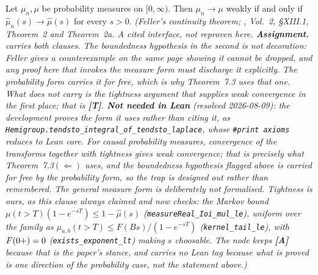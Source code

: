 \begin{proposition}\label{prop:laplace-continuity}
Let $\mu_n, \mu$ be probability measures on $[0,\infty)$. Then $\mu_n \to \mu$ weakly if and
only if $\hat\mu_n(s) \to \hat\mu(s)$ for every $s > 0$.
\statusA\quad{}\quad\emph{(Feller's continuity theorem;
, Vol.~2, \S XIII.1, Theorem~2 and Theorem~2a. A cited
interface, not reproven here. \textbf{Assignment.}  carries both clauses. The
boundedness hypothesis in the second is not decoration: Feller gives a counterexample on the
same page showing it cannot be dropped, and any proof here that invokes the measure form must
discharge it explicitly. The probability form carries it for free, which is why Theorem~7.3
uses that one. What  does not carry is the tightness argument that supplies weak
convergence in the first place; that is \textbf{[T]}. \textbf{Not needed in Lean} (resolved
2026-08-09): the development proves the form it uses rather than citing it, as
\texttt{Hemigroup.tendsto\_integral\_of\_tendsto\_laplace}, whose \texttt{\#print axioms} reduces
to Lean core. For \emph{causal probability} measures, convergence of the transforms together with
tightness gives weak convergence; that is precisely what Theorem~7.3$(\Leftarrow)$ uses, and the
boundedness hypothesis flagged above is carried for free by the probability form, so the trap is
designed out rather than remembered. The general measure form is deliberately \emph{not}
formalised. Tightness is ours, as this clause always claimed and now checks: the Markov bound
$\mu(t>T)(1-e^{-sT}) \le 1 - \hat\mu(s)$ (\texttt{measureReal\_Ioi\_mul\_le}), uniform over the
family as $\mu_{a,b}(t>T) \le F(Bs)/(1-e^{-sT})$ (\texttt{kernel\_tail\_le}), with $F(0{+}) = 0$
(\texttt{exists\_exponent\_lt}) making $s$ choosable. The node keeps \textbf{[A]} because that is
the \emph{paper's} stance, and carries no Lean tag because what is proved is one direction of the
probability case, not the statement above.)}
\end{proposition}

